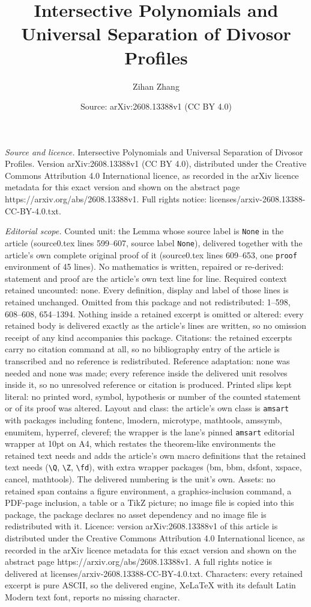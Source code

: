\documentclass[10pt,a4paper]{amsart}
\title[Intersective Polynomials and Universal Separation of Divosor]{Intersective Polynomials and Universal Separation of Divosor Profiles}
\author{Zihan Zhang}
\date{Source: arXiv:2608.13388v1 (CC BY 4.0)}
\begin{document}
\maketitle

\noindent\emph{Source and licence.} Intersective Polynomials and Universal Separation of Divosor Profiles. Version arXiv:2608.13388v1 (CC BY 4.0), distributed under the Creative Commons Attribution 4.0 International licence, as recorded in the arXiv licence metadata for this exact version and shown on the abstract page https://arxiv.org/abs/2608.13388v1. Full rights notice: licenses/arxiv-2608.13388-CC-BY-4.0.txt.\par\smallskip

\noindent\textit{Editorial scope.} Counted unit: the Lemma whose source label is \texttt{None} in the article (source0.tex lines 599--607, source label \texttt{None}), delivered together with the article's own complete original proof of it (source0.tex lines 609--653, one \texttt{proof} environment of 45 lines). No mathematics is written, repaired or re-derived: statement and proof are the article's own text line for line. Required context retained uncounted: none. Every definition, display and label of those lines is retained unchanged. Omitted from this package and not redistributed: 1--598, 608--608, 654--1394. Nothing inside a retained excerpt is omitted or altered: every retained body is delivered exactly as the article's lines are written, so no omission receipt of any kind accompanies this package. Citations: the retained excerpts carry no citation command at all, so no bibliography entry of the article is transcribed and no reference is redistributed. Reference adaptation: none was needed and none was made; every reference inside the delivered unit resolves inside it, so no unresolved reference or citation is produced. Printed slips kept literal: no printed word, symbol, hypothesis or number of the counted statement or of its proof was altered. Layout and class: the article's own class is \texttt{amsart} with packages including fontenc, lmodern, microtype, mathtools, amssymb, enumitem, hyperref, cleveref; the wrapper is the lane's pinned \texttt{amsart} editorial wrapper at 10pt on A4, which restates the theorem-like environments the retained text needs and adds the article's own macro definitions that the retained text needs (\texttt{\textbackslash Q}, \texttt{\textbackslash Z}, \texttt{\textbackslash fd}), with extra wrapper packages (bm, bbm, dsfont, xspace, cancel, mathtools). The delivered numbering is the unit's own. Assets: no retained span contains a figure environment, a graphics-inclusion command, a PDF-page inclusion, a table or a TikZ picture; no image file is copied into this package, the package declares no asset dependency and no image file is redistributed with it. Licence: version arXiv:2608.13388v1 of this article is distributed under the Creative Commons Attribution 4.0 International licence, as recorded in the arXiv licence metadata for this exact version and shown on the abstract page https://arxiv.org/abs/2608.13388v1. A full rights notice is delivered at licenses/arxiv-2608.13388-CC-BY-4.0.txt. Characters: every retained excerpt is pure ASCII, so the delivered engine, XeLaTeX with its default Latin Modern text font, reports no missing character.
\end{document}
